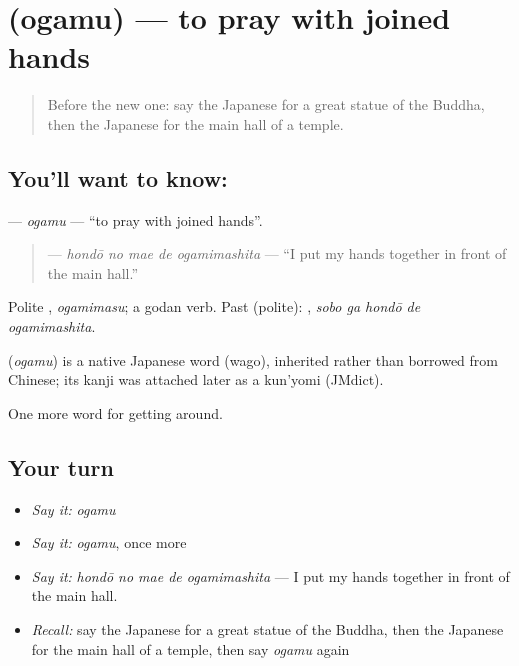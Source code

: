 \section[\texorpdfstring{\ja{おがむ} (ogamu)}{おがむ (ogamu)}]{ (ogamu) — to pray with joined hands}

\label{lesson:JA-C407-ogamu}



\begin{quote}
Before the new one: say the Japanese for a great statue of the Buddha, then the Japanese for the main hall of a temple.
\end{quote}

\subsection*{You'll want to know: }
\textbf{} — \emph{ogamu} — \textquotedblleft{}to pray with joined hands\textquotedblright{}.

\begin{quote}
\textbf{  } — \emph{hondō no mae de ogamimashita} — \textquotedblleft{}I put my hands together in front of the main hall.\textquotedblright{}
\end{quote}

Polite \textbf{}, \emph{ogamimasu}; a godan verb. Past (polite): \textbf{  }, \emph{sobo ga hondō de ogamimashita}.

\begin{cousinweb}
\textbf{} (\emph{ogamu}) is a native Japanese word (wago), inherited rather than borrowed from Chinese; its kanji was attached later as a kun'yomi (JMdict).
\end{cousinweb}

\begin{grammarlens}[title={What you've built}]
One more word for getting around.
\end{grammarlens}

\subsection*{Your turn}
\begin{itemize}
\raggedright
  \item \emph{Say it:} \emph{ogamu}
  \item \emph{Say it:} \emph{ogamu}, once more
  \item \emph{Say it:} \emph{hondō no mae de ogamimashita} — I put my hands together in front of the main hall.
  \item \emph{Recall:} say the Japanese for a great statue of the Buddha, then the Japanese for the main hall of a temple, then say \emph{ogamu} again
\end{itemize}

